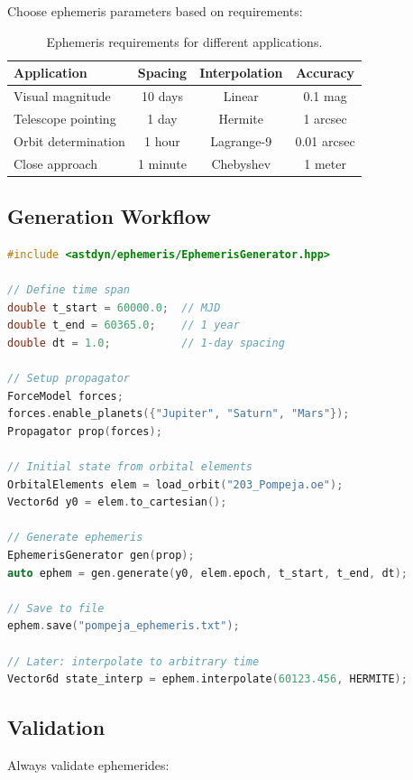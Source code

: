 Choose ephemeris parameters based on requirements:

\begin{table}[htbp]
\centering
\begin{tabular}{lccc}
\toprule
\textbf{Application} & \textbf{Spacing} & \textbf{Interpolation} & \textbf{Accuracy} \\
\midrule
Visual magnitude & 10 days & Linear & 0.1 mag \\
Telescope pointing & 1 day & Hermite & 1 arcsec \\
Orbit determination & 1 hour & Lagrange-9 & 0.01 arcsec \\
Close approach & 1 minute & Chebyshev & 1 meter \\
\bottomrule
\end{tabular}
\caption{Ephemeris requirements for different applications.}
\label{tab:ephemeris_req}
\end{table}

\subsection{Generation Workflow}

\begin{lstlisting}[language=C++,caption={Ephemeris generation}]
#include <astdyn/ephemeris/EphemerisGenerator.hpp>

// Define time span
double t_start = 60000.0;  // MJD
double t_end = 60365.0;    // 1 year
double dt = 1.0;           // 1-day spacing

// Setup propagator
ForceModel forces;
forces.enable_planets({"Jupiter", "Saturn", "Mars"});
Propagator prop(forces);

// Initial state from orbital elements
OrbitalElements elem = load_orbit("203_Pompeja.oe");
Vector6d y0 = elem.to_cartesian();

// Generate ephemeris
EphemerisGenerator gen(prop);
auto ephem = gen.generate(y0, elem.epoch, t_start, t_end, dt);

// Save to file
ephem.save("pompeja_ephemeris.txt");

// Later: interpolate to arbitrary time
Vector6d state_interp = ephem.interpolate(60123.456, HERMITE);
\end{lstlisting}

\subsection{Validation}

Always validate ephemerides:

